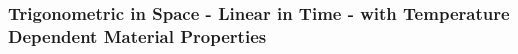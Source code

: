
\subsubsection{Trigonometric in  Space - Linear in Time - with Temperature Dependent Material Properties}

